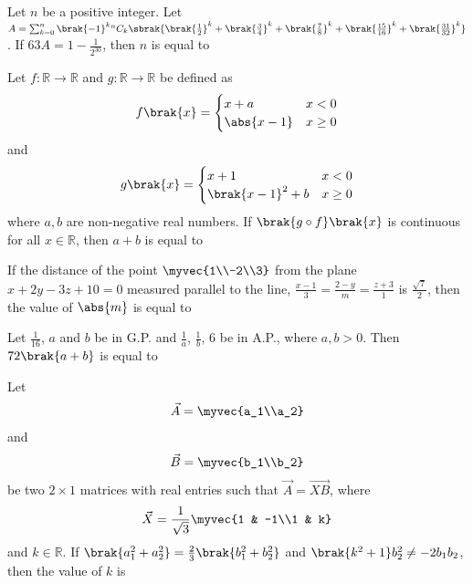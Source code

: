     \item Let $n$ be a positive integer. Let $A = \sum^{n}_{k = 0}\brak{-1}^k {}^{n}C_k\sbrak{\brak{\frac{1}{2}}^k + \brak{\frac{3}{4}}^k + \brak{\frac{7}{8}}^k + \brak{\frac{15}{16}}^k + \brak{\frac{31}{32}}^k}$. If $63A = 1 - \frac{1}{2^{30}}$, then $n$ is equal to
    \hfill{}

    \item Let $f \colon \mathbb{R} \to \mathbb{R}$ and $g \colon \mathbb{R} \to \mathbb{R}$ be defined as
	\begin{align*}
		f\brak{x} = 
		\begin{cases}
			x + a & x < 0\\
			\abs{x - 1} & x \geq 0\\
		\end{cases}
	\end{align*} and
	\begin{align*}
		g\brak{x} = 
		\begin{cases}
			x + 1 & x < 0\\
			\brak{x - 1}^2 + b & x \geq 0\\
		\end{cases}
	\end{align*}
	where $a, b$ are non-negative real numbers. If $\brak{g \circ f}\brak{x}$ is continuous for all $x \in \mathbb{R}$, then $a + b$ is equal to
    \hfill{}

    \item If the distance of the point $\myvec{1\\-2\\3}$ from the plane $x + 2y - 3z + 10 = 0$ measured parallel to the line, $\frac{x - 1}{3} = \frac{2 - y}{m} = \frac{z + 3}{1}$ is $\frac{\sqrt{7}}{2}$, then the value of $\abs{m}$ is equal to
    \hfill{}

    \item Let $\frac{1}{16}$, $a$ and $b$ be in G.P. and $\frac{1}{a}$, $\frac{1}{b}$, $6$ be in A.P., where $a, b >0$. Then $72\brak{a+b}$ is equal to
    \hfill{}

    \item Let 
	\begin{align*}
		\vec{A} = \myvec{a_1\\a_2}
	\end{align*} and
	\begin{align*}
		\vec{B} = \myvec{b_1\\b_2}
	\end{align*}
	be two $2\times 1$ matrices with real entries such that $\vec{A} = \vec{XB}$, where
	\begin{align*}
		\vec{X} = \frac{1}{\sqrt{3}}\myvec{1 & -1\\1 & k}
	\end{align*}
	and $k \in \mathbb{R}$. If $\brak{a_1^2 + a_2^2} = \frac{2}{3} \brak{b_1^2 + b_2^2}$ and $\brak{k^2 + 1} b_2^2 \neq -2b_1b_2$, then the value of $k$ is
    \hfill{}

